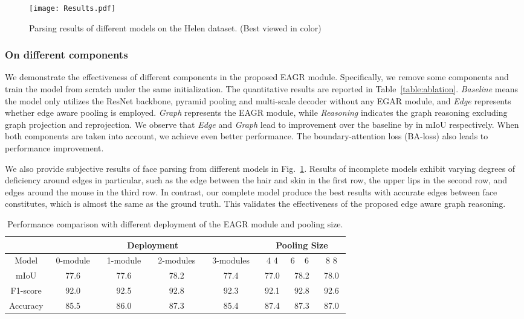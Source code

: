 \documentclass[runningheads]{llncs}
\begin{document}
\begin{figure}[t]
    \centering
    \texttt{[image: Results.pdf]}
    \caption{Parsing results of different models on the Helen dataset. (Best viewed in color)}
    \label{fig:ablation_result}
\end{figure}

\subsubsection{On different components}

We demonstrate the effectiveness of different components in the proposed EAGR module. 
Specifically, we remove some components and train the model from scratch under the same initialization. 
The quantitative results are reported in Table~\ref{table:ablation}. {\it Baseline} means the model only utilizes the ResNet backbone, pyramid pooling and multi-scale decoder without any EGAR module, and {\it Edge} represents whether edge aware pooling is employed.
{\it Graph} represents the EAGR module, while {\it Reasoning} indicates the graph reasoning excluding graph projection and reprojection. 
We observe that {\it Edge} and {\it Graph} lead to improvement over the baseline by  in mIoU respectively. 
When both components are taken into account, we achieve even better performance. 
The boundary-attention loss (BA-loss) also leads to performance improvement. 

We also provide subjective results of face parsing from different models in Fig.~\ref{fig:ablation_result}.
Results of incomplete models exhibit varying degrees of deficiency around edges in particular, such as the edge between the hair and skin in the first row, the upper lips in the second row, and edges around the mouse in the third row. 
In contrast, our complete model produce the best results with accurate edges between face constitutes, which is almost the same as the ground truth. 
This validates the effectiveness of the proposed edge aware graph reasoning. 

\begin{table}[t]
\centering
\caption{Performance comparison with different deployment of the EAGR module and pooling size.}
\label{table:modules}
\begin{tabular}{c|c|c|c|c|c|c|c}
\toprule
\begin{minipage}{2cm} \centering  \end{minipage} & \multicolumn{4}{c|}{Deployment} & \multicolumn{3}{c}{Pooling Size} \\
\hline
Model & ~0-module~ & ~1-module~ & ~2-modules~ & ~3-modules~ &  ~4  4~ & 6 ~ 6~ & ~8  8~ \\ 
\hline
mIoU      & 77.6 & 77.6 &  78.2 & 77.4 &  77.0 & 78.2 & 78.0 \\ 
F1-score    & 92.0 & 92.5 & 92.8 & 92.3 &  92.1 & 92.8 & 92.6 \\ 
Accuracy & 85.5 & 86.0 & 87.3 & 85.4 &  87.4 & 87.3 & 87.0\\ 
\bottomrule

\end{tabular}
\end{table}
\end{document}
